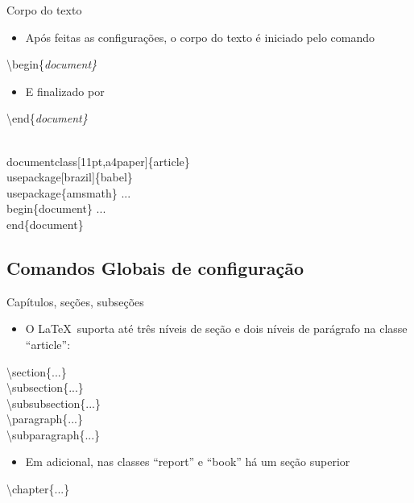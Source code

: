\begin{frame}[fragile]{Corpo do texto}
    \begin{itemize}
    \item Após feitas as configurações, o corpo do texto é iniciado pelo comando
    \end{itemize}

    \alert{\textbackslash begin\{\it document\}}
    
    \begin{itemize}
    \item E finalizado por
    \end{itemize}

    \alert{\textbackslash end\{\it document\}}

    \begin{example}
        \begin{semiverbatim}
\\documentclass[11pt,a4paper]\{article\}
\\usepackage[brazil]\{babel\}
\\usepackage\{amsmath\}
...
\\begin\{document\}
...
\\end\{document\}
\end{semiverbatim}
    \end{example}
\end{frame}

\subsection{Comandos Globais de configuração}

\begin{frame}{Capítulos, seções, subseções}
    \begin{itemize}
    \item O \LaTeX\ suporta até três níveis de seção e dois níveis de parágrafo na classe ``article'':
    \end{itemize}
    
    \alert{\textbackslash section\{...\} \\
           \textbackslash subsection\{...\} \\
           \textbackslash subsubsection\{...\} \\
           \textbackslash paragraph\{...\} \\
           \textbackslash subparagraph\{...\} \\
        }
    
    \begin{itemize}
    \item Em adicional, nas classes ``report'' e ``book'' há um seção superior
    \end{itemize}

    \alert{\textbackslash chapter\{...\}}
\end{frame}

